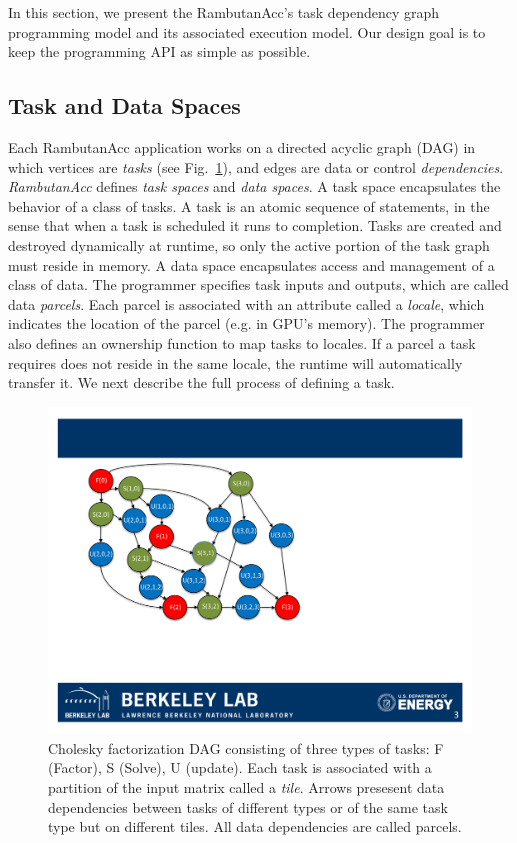 In this section, we present the RambutanAcc's task dependency graph programming model and its associated execution model.
Our design goal is to keep the programming API as simple as possible.


\subsection{Task and Data Spaces}
Each RambutanAcc application works on a directed acyclic graph (DAG) in which vertices are {\em tasks} (see Fig.~\ref{fig:cholesky}),
and edges are data or control {\em dependencies}.
{\em RambutanAcc} defines {\em task spaces} and {\em data spaces}.
A task space encapsulates the behavior of a class of tasks.
A task is an atomic sequence of statements, in the sense that when a task is scheduled it runs to completion.
Tasks are created and destroyed dynamically at runtime, so only the active portion of the task graph must reside in memory.
A data space encapsulates access and management of a class of data.
The programmer specifies task inputs and outputs, which are called data {\em parcels}.
Each parcel is associated with an attribute called a {\em locale}, which indicates the location of the parcel (e.g. in GPU's memory).
The programmer also defines an ownership function to map tasks to locales.
If a parcel a task requires does not reside in the same locale, the runtime will automatically transfer it.
We next describe the full process of defining a task.

\begin{figure}[htb]
\centering
\includegraphics[width=.4\textwidth]{figures/cholesky.pdf}
\caption{Cholesky factorization DAG consisting of three types of tasks: F (Factor), S (Solve), U (update). Each task is associated with a partition of the input matrix called a {\em tile}. Arrows presesent data dependencies between tasks of different types or of the same task type but on different tiles. All data dependencies are called parcels.}
\label{fig:cholesky}
\end{figure}



